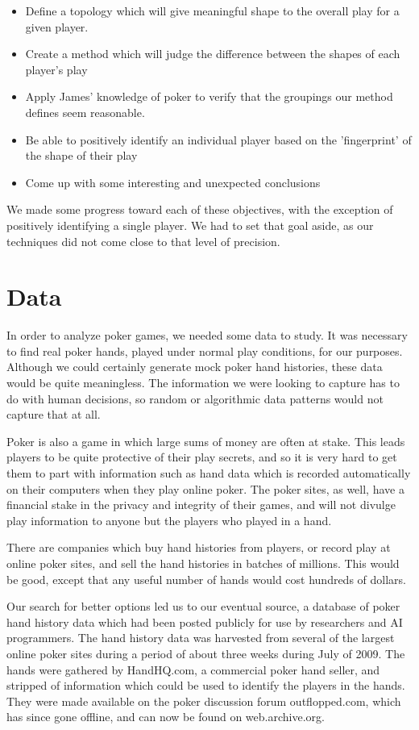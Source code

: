 \documentclass[11pt]{article}
\begin{document}
\begin{itemize}[noitemsep]
	\item Define a topology which will give meaningful shape to the overall play
	for a given player.
	\item Create a method which will judge the difference between the shapes of
	each player's play
	\item Apply James' knowledge of poker to verify that the groupings our method
	defines seem reasonable.
	\item Be able to positively identify an individual player based on the
	'fingerprint' of the shape of their play
	\item Come up with some interesting and unexpected conclusions
\end{itemize}

We made some progress toward each of these
objectives, with the exception of positively identifying a single player. We had to
set that goal aside, as our techniques did not come close to that level of
precision.

\section*{Data}
In order to analyze poker games, we needed some data to study. It was necessary to
find real poker hands, played under normal play conditions, for our purposes. Although
we could certainly generate mock poker hand histories, these data would be quite
meaningless. The information we were looking to capture has to do with human decisions,
so random or algorithmic data patterns would not capture that at all.

Poker is also a game in which large sums of money are often at stake. This leads players
to be quite protective of their play secrets, and so it is very hard to get them
to part with information such as hand data which is recorded automatically on their
computers when they play online poker. The poker sites, as well, have a financial stake
in the privacy and integrity of their games, and will not divulge play information
to anyone but the players who played in a hand.

There are companies which buy hand histories from players, or record play at
online poker sites, and sell the hand histories in batches of millions. This
would be good, except that any useful number of hands would cost hundreds
of dollars.

Our search for better options led us to our eventual source, a database of poker
hand history data which had been posted publicly for use by researchers and AI
programmers. The hand history data was harvested from several of the largest
online poker sites during a period of about three weeks during July of 2009. The
hands were gathered by HandHQ.com, a commercial poker hand seller, and stripped
of information which could be used to identify the players in the hands. They were
made available on the poker discussion forum outflopped.com, which has since
gone offline, and can now be found on web.archive.org.
\end{document}
